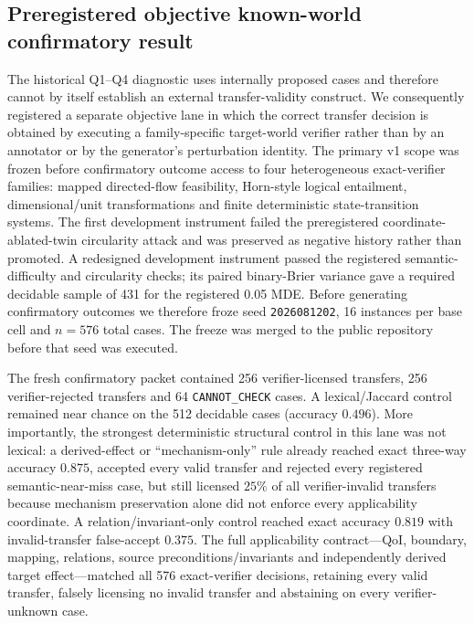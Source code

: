 \subsection{Preregistered objective known-world confirmatory result}
\label{sec:objective-confirmatory}

The historical Q1--Q4 diagnostic uses internally proposed cases and therefore cannot by itself establish an external transfer-validity construct. We consequently registered a separate objective lane in which the correct transfer decision is obtained by executing a family-specific target-world verifier rather than by an annotator or by the generator's perturbation identity. The primary v1 scope was frozen before confirmatory outcome access to four heterogeneous exact-verifier families: mapped directed-flow feasibility, Horn-style logical entailment, dimensional/unit transformations and finite deterministic state-transition systems. The first development instrument failed the preregistered coordinate-ablated-twin circularity attack and was preserved as negative history rather than promoted. A redesigned development instrument passed the registered semantic-difficulty and circularity checks; its paired binary-Brier variance gave a required decidable sample of 431 for the registered 0.05 MDE. Before generating confirmatory outcomes we therefore froze seed \texttt{2026081202}, 16 instances per base cell and $n=576$ total cases. The freeze was merged to the public repository before that seed was executed.

The fresh confirmatory packet contained 256 verifier-licensed transfers, 256 verifier-rejected transfers and 64 \texttt{CANNOT\_CHECK} cases. A lexical/Jaccard control remained near chance on the 512 decidable cases (accuracy $0.496$). More importantly, the strongest deterministic structural control in this lane was not lexical: a derived-effect or ``mechanism-only'' rule already reached exact three-way accuracy $0.875$, accepted every valid transfer and rejected every registered semantic-near-miss case, but still licensed $25\%$ of all verifier-invalid transfers because mechanism preservation alone did not enforce every applicability coordinate. A relation/invariant-only control reached exact accuracy $0.819$ with invalid-transfer false-accept $0.375$. The full applicability contract---QoI, boundary, mapping, relations, source preconditions/invariants and independently derived target effect---matched all 576 exact-verifier decisions, retaining every valid transfer, falsely licensing no invalid transfer and abstaining on every verifier-unknown case.

